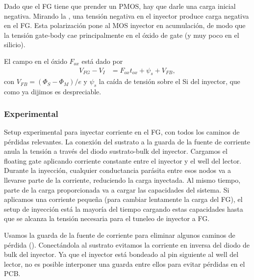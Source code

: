 Dado que el FG tiene que prender un PMOS,
hay que darle una carga inicial negativa.
Mirando la ,
una tensión negativa en el inyector
produce carga negativa en el FG.
Esta polarización pone al MOS inyector en acumulación,
de modo que la tensión gate-body cae principalmente 
en el óxido de gate (y muy poco en el silicio).

El campo en el óxido $F_{ox}$ está dado por 
\begin{align*}
    V_{FG}-V_I &= F_{ox}t_{ox}+\psi_s+V_{FB},
\end{align*}
con $V_{FB}=(\Phi_S-\Phi_M)/e$ 
y $\psi_s$ la caída de tensión sobre el Si del inyector,
que como ya dijimos es despreciable.
%
\subsubsection{Experimental}
{Setup experimental para inyectar corriente en el FG,
con todos los caminos de pérdidas relevantes.
La conexión del sustrato a la guarda de la fuente de corriente
anula la tensión a través del diodo sustrato-bulk del inyector.}
Cargamos el floating gate aplicando corriente constante
entre el inyector y el well del lector.
Durante la inyección,
cualquier conductancia parásita entre esos nodos 
va a llevarse parte de la corriente,
reduciendo la carga inyectada.
Al mismo tiempo, parte de la carga proporcionada
va a cargar las capacidades del sistema.
Si aplicamos una corriente pequeña
(para cambiar lentamente la carga del FG),
el setup de inyección está la mayoría del tiempo cargando estas capacidades
hasta que se alcanza la tensión necesaria para el tuneleo de inyector a FG.

Usamos la guarda de la fuente de corriente para eliminar algunos caminos de pérdida
().
Conectándola al sustrato evitamos la corriente en inversa del diodo de bulk
del inyector.
Ya que el inyector está bondeado al pin siguiente al well del lector,
no es posible interponer una guarda entre ellos para evitar pérdidas en el PCB.
